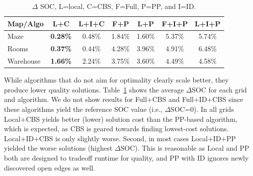 \documentclass[letterpaper]{article} %
\def\
UrlFont{\rm}  %
\theoremstyle{definition}
\begin{document}
\begin{table}
\centering
\footnotesize
\begin{tabular}{@{}l|cccccc@{}}
\toprule
Map/Algo  & L+C & L+I+C & F+P & L+P & F+I+P & L+I+P \\ \midrule
Maze      & \textbf{0.28\%} & 0.48\%     & 1.84\%    & 1.60\%     & 5.37\%       & 5.74\%       \\
Rooms     & \textbf{0.37\%}  & 0.44\%    & 4.28\%    & 3.96\%     & 4.91\%       & 6.48\%        \\
Warehouse & \textbf{1.66\%}  & 2.24\%    & 3.75\%    & 3.60\%     & 4.49\%       & 4.58\%        \\ \bottomrule
\end{tabular}
    \caption{$\Delta$ SOC, L=local, C=CBS, F=Full, P=PP, and I=ID.}
    \label{tab:delta-soc}
\end{table}

While algorithms that do not aim for optimality clearly scale better, they produce lower quality solutions.
Table~\ref{tab:delta-soc} shows the average $\Delta$SOC for each grid and algorithm. We do not show results for Full+CBS and Full+ID+CBS since these algorithms yield the reference SOC value (i.e., $\Delta$SOC=0).
In all grids Local+CBS yields better (lower) solution cost than the PP-based algorithm, which is expected, as CBS is geared towards finding lowest-cost solutions. Local+ID+CBS is only slightly worse.
Second, in most cases Local+ID+PP yielded the worse solutions (highest $\Delta$SOC). This is reasonable as Local and PP both are designed to tradeoff runtime for quality, and PP with ID ignores newly discovered open edges as well.

\end{document}

